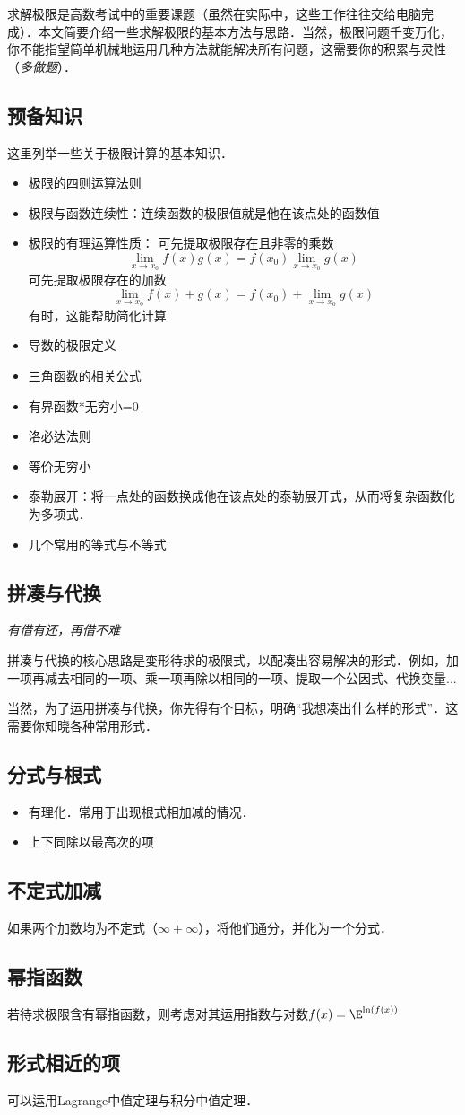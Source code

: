 
\begin{issues}
\issueDraft
\end{issues}

求解极限是高数考试中的重要课题（虽然在实际中，这些工作往往交给电脑完成）．本文简要介绍一些求解极限的基本方法与思路．当然，极限问题千变万化，你不能指望简单机械地运用几种方法就能解决所有问题，这需要你的积累与灵性（\textsl{多做题}）．

\subsection{预备知识}
这里列举一些关于极限计算的基本知识．
\begin{itemize}
\item 极限的四则运算法则
\item 极限与函数连续性：连续函数的极限值就是他在该点处的函数值
\item 极限的有理运算性质：
可先提取极限存在且非零的乘数 
$$\lim_{x\to x_0} f(x)g(x) = f(x_0)\lim_{x\to x_0} g(x)$$
可先提取极限存在的加数
$$\lim_{x\to x_0} f(x)+g(x) = f(x_0)+\lim_{x\to x_0} g(x)$$
有时，这能帮助简化计算
\item 导数的极限定义
\item 三角函数的相关公式
\item 有界函数*无穷小=0
\item 洛必达法则
\item 等价无穷小
\item 泰勒展开：将一点处的函数换成他在该点处的泰勒展开式，从而将复杂函数化为多项式．
\item 几个常用的等式与不等式
\end{itemize}

\subsection{拼凑与代换}
\textsl{有借有还，再借不难}

拼凑与代换的核心思路是变形待求的极限式，以配凑出容易解决的形式．例如，加一项再减去相同的一项、乘一项再除以相同的一项、提取一个公因式、代换变量...

当然，为了运用拼凑与代换，你先得有个目标，明确“我想凑出什么样的形式”．这需要你知晓各种常用形式．

\subsection{分式与根式}
\begin{itemize}
\item 有理化．常用于出现根式相加减的情况．
\item 上下同除以最高次的项
\end{itemize}

\subsection{不定式加减}
如果两个加数均为不定式（$\infty+\infty$），将他们通分，并化为一个分式．

\subsection{幂指函数}
若待求极限含有幂指函数，则考虑对其运用指数与对数$f(x)=\E^{\ln(f(x))}$

\subsection{形式相近的项}
可以运用Lagrange中值定理与积分中值定理．